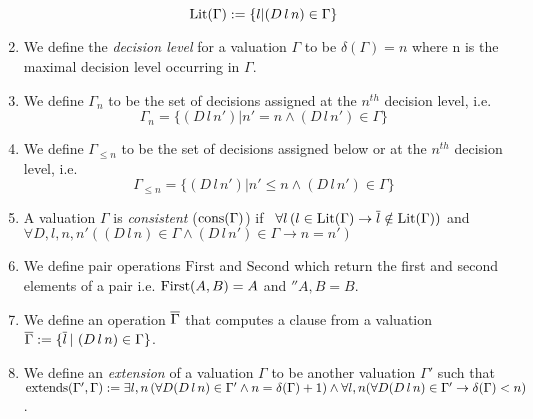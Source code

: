 \begin{mydef}
\begin{enumerate}
	 $$ \mathrm{Lit}(\Gamma) := \{l | (D \, l \, n) \in \Gamma\}$$
%
%
%
\item We define the \emph{decision level} for a valuation $\Gamma$ to be $\delta (\Gamma) = n$ where n is the maximal decision level occurring in $\Gamma$.
%
\item We define $\Gamma_{n}$ to be the set of  decisions assigned at the $n^{th}$ decision level, i.e. 
	$$\Gamma_{n} = \{(D \, l \, n') | n' = n  \wedge (D \, l \, n') \in \Gamma \}$$
%
\item We define $\Gamma_{\leq n}$ to be the set of decisions assigned below or at the $n^{th}$ decision level, i.e. 
	$$\Gamma_{\leq n} = \{( D \, l \, n') | n' \leq n \wedge (D \, l \, n') \in \Gamma \}$$
%
\item A valuation $\Gamma$ is \emph{consistent} ($\mathrm{cons}(\Gamma)$) if \, 
%
$\forall l \,( l \in \mathrm{Lit}(\Gamma) \to \overline{l} \notin \mathrm{Lit}(\Gamma))$
%
 and 
%
$\forall D,l,n,n'( (D \, l \, n) \in \Gamma \wedge (D \, l \, n') \in \Gamma \to n = n')$
%
%
%
\item We define pair operations $\mathrm{First}$ and $\mathrm{Second}$ which return the first and second elements of a pair i.e. $\mathrm{First}(A,B) = A$ and $\second{A,B} = B$.
%
\item We define an operation $\overline{\Gamma}$ that computes a clause from a valuation $\overline{\Gamma} := \{ \overline{l}\, | \, \, (D \, l \, n) \in \Gamma \}$.
%
\item We define an \emph{extension} of a valuation $\Gamma$ to be another valuation $\Gamma'$ such that $\mathrm{extends(\Gamma',\Gamma)} :=  \exists l,n \, ( \forall D (D \, l \, n) \in \Gamma' \wedge n  = \delta(\Gamma) + 1) \wedge \forall l,n ( \forall D (D \, l \, n) \in \Gamma' \to  \delta(\Gamma) < n)$.

\end{enumerate}
\end{mydef}
\hspace{1mm} \\

